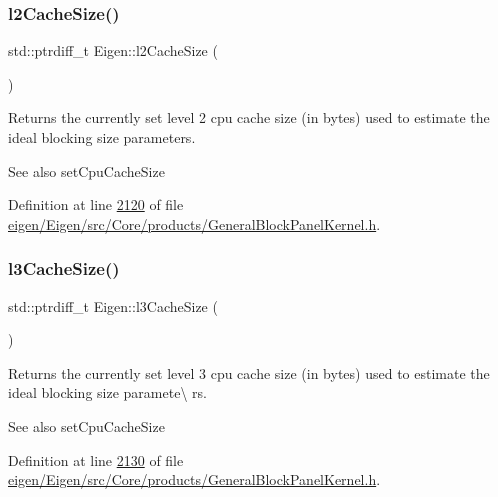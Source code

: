 \subsubsection{\texorpdfstring{l2\+Cache\+Size()}{l2CacheSize()}}
{\footnotesize\ttfamily std\+::ptrdiff\+\_\+t Eigen\+::l2\+Cache\+Size (\begin{DoxyParamCaption}{ }\end{DoxyParamCaption})\hspace{0.3cm}{\ttfamily [inline]}}

\begin{DoxyReturn}{Returns}
the currently set level 2 cpu cache size (in bytes) used to estimate the ideal blocking size parameters. 
\end{DoxyReturn}
\begin{DoxySeeAlso}{See also}
set\+Cpu\+Cache\+Size 
\end{DoxySeeAlso}


Definition at line \hyperlink{eigen_2_eigen_2src_2_core_2products_2_general_block_panel_kernel_8h_source_l02120}{2120} of file \hyperlink{eigen_2_eigen_2src_2_core_2products_2_general_block_panel_kernel_8h_source}{eigen/\+Eigen/src/\+Core/products/\+General\+Block\+Panel\+Kernel.\+h}.

\mbox{\label{namespace_eigen_ae2efa4852ea90c2d47b7dcec5b40ba2b}} 
\subsubsection{\texorpdfstring{l3\+Cache\+Size()}{l3CacheSize()}}
{\footnotesize\ttfamily std\+::ptrdiff\+\_\+t Eigen\+::l3\+Cache\+Size (\begin{DoxyParamCaption}{ }\end{DoxyParamCaption})\hspace{0.3cm}{\ttfamily [inline]}}

\begin{DoxyReturn}{Returns}
the currently set level 3 cpu cache size (in bytes) used to estimate the ideal blocking size paramete\textbackslash{} rs. 
\end{DoxyReturn}
\begin{DoxySeeAlso}{See also}
set\+Cpu\+Cache\+Size 
\end{DoxySeeAlso}


Definition at line \hyperlink{eigen_2_eigen_2src_2_core_2products_2_general_block_panel_kernel_8h_source_l02130}{2130} of file \hyperlink{eigen_2_eigen_2src_2_core_2products_2_general_block_panel_kernel_8h_source}{eigen/\+Eigen/src/\+Core/products/\+General\+Block\+Panel\+Kernel.\+h}.

